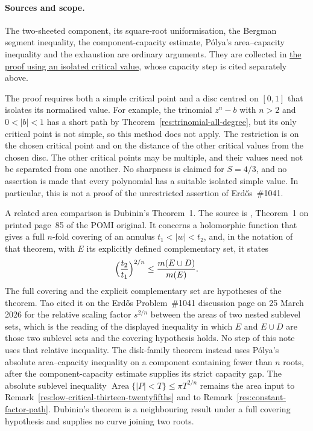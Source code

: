 \documentclass[11pt]{article}
\begin{document}
\paragraph{Sources and scope.}
\label{bdry:critical-value-separation}
The two-sheeted component, its square-root uniformisation, the Bergman segment
inequality, the component-capacity estimate, P\'olya's area--capacity
inequality and the exhaustion are ordinary arguments. They are collected in
\href{https://github.com/wcook04/plectis-erdos/blob/8efbccc235df64a38d83f5dc7b1949e2ad18270d/research_corpus/Erdos1041/problem/DiskFamilyCriticalValueSeparation.md}{the proof using an isolated critical value}, whose capacity step is cited
separately above.

The proof requires both a simple critical point and a disc centred on
$[0,1]$ that isolates its normalised value. For example, the trinomial
$z^n-b$ with $n>2$ and $0<|b|<1$ has a short path by
Theorem~\ref{res:trinomial-all-degree}, but its only critical point is not
simple, so this method does not apply. The restriction is on the chosen
critical point and on the distance of the other critical values from the
chosen disc. The other critical points may be multiple, and their values
need not be separated from one another. No sharpness is claimed for
$S=4/3$, and no assertion is made that every polynomial has a suitable
isolated simple value. In particular, this is not a proof of the
unrestricted assertion of Erd\H{o}s~\#1041.

A related area comparison is Dubinin's Theorem~1. The
source is \cite{dubinin}, Theorem~1 on printed page~85 of the POMI original.
It concerns a holomorphic function that gives a full $n$-fold covering of an
annulus $t_1<|w|<t_2$, and, in the notation of that theorem, with $E$ its
explicitly defined complementary set, it states
\[
 \Bigl(\frac{t_2}{t_1}\Bigr)^{2/n}\le\frac{m(E\cup D)}{m(E)}.
\]
The full covering and the explicit complementary set are hypotheses of the
theorem.  Tao cited it on the Erd\H{o}s Problem~\#1041 discussion page on
25 March 2026 for the relative scaling factor $s^{2/n}$ between the areas of
two nested sublevel sets, which is the reading of the displayed inequality in
which $E$ and $E\cup D$ are those two sublevel sets and the covering
hypothesis holds.  No step of this note uses that relative inequality.  The
disk-family theorem instead uses P\'olya's absolute area--capacity inequality
on a component containing fewer than $n$ roots, after the
component-capacity estimate supplies its strict
capacity gap.  The absolute sublevel inequality
$\operatorname{Area}\{|P|<T\}\le\pi T^{2/n}$ remains the area input to
Remark~\ref{res:low-critical-thirteen-twentyfifths} and to
Remark~\ref{res:constant-factor-path}.  Dubinin's theorem is a neighbouring
result under a full covering hypothesis and supplies no curve joining two roots.
\end{document}
